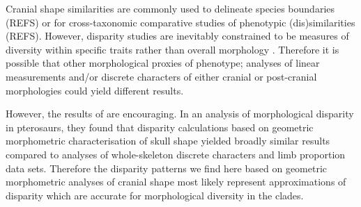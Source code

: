 \documentclass[12pt,a4paper]{article}
\begin{document}
Cranial shape similarities are commonly used to delineate species boundaries (REFS) or for cross-taxonomic comparative studies of phenotypic (dis)similarities (REFS). However, disparity studies are inevitably constrained to be measures of diversity within specific traits rather than overall morphology \citep{Roy1997}. Therefore it is possible that other morphological proxies of phenotype; analyses of linear measurements and/or discrete characters of either cranial or post-cranial morphologies could yield different results. 

However, the results of \citep{Foth2012} are encouraging. In an analysis of morphological disparity in pterosaurs, they found that disparity calculations based on geometric morphometric characterisation of skull shape yielded broadly similar results compared to analyses of whole-skeleton discrete characters and limb proportion data sets. Therefore the disparity patterns we find here based on geometric morphometric analyses of cranial shape most likely represent approximations of disparity which are accurate for morphological diversity in the clades. 











\end{document}
